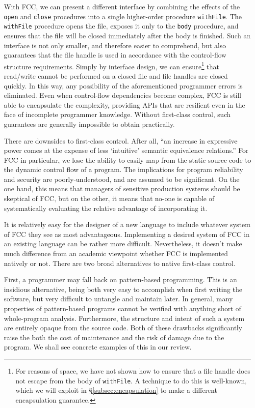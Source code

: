 \documentclass[11pt]{article}
\begin{document}
With FCC, we can present a different interface by combining the effects of the \texttt{open} and \texttt{close} procedures into a single higher-order procedure \texttt{withFile}.
The \texttt{withFile} procedure opens the file, exposes it only to the \texttt{body} procedure, and ensures that the file will be closed immediately after the body is finished.
Such an interface is not only smaller, and therefore easier to comprehend, but also guarantees that the file handle is used in accordance with the control-flow structure requirements.
Simply by interface design, we can ensure\footnote{For reasons of space, we have not shown how to ensure that a file handle does not escape from the body of \texttt{withFile}. A technique to do this is well-known\cite{StateInHaskell}, which we will exploit in \S\ref{subsec:encapsulation} to make a different encapsulation guarantee.} that read/write cannot be performed on a closed file and file handles are closed quickly.
In this way, any possibility of the aforementioned programmer errors is eliminated.
Even when control-flow dependencies become complex, FCC is still able to encapsulate the complexity, providing APIs that are resilient even in the face of incomplete programmer knowledge.
Without first-class control, such guarantees are generally impossible to obtain practically.


There are downsides to first-class control. After all, ``an increase in expressive power comes at the expense of less `intuitive' semantic equivalence relations.''\cite{Felleisen90expressive}
For FCC in particular, we lose the ability to easily map from the static source code to the dynamic control flow of a program.
The implications for program reliability and security are poorly-understood, and are assumed to be significant.
On the one hand, this means that managers of sensitive production systems should be skeptical of FCC, but on the other, it means that no-one is capable of systematically evaluating the relative advantage of incorporating it.

It is relatively easy for the designer of a new language to include whatever system of FCC they see as most advantageous.
Implementing a desired system of FCC in an existing language can be rather more difficult.
Nevertheless, it doesn't make much difference from an academic viewpoint whether FCC is implemented natively or not.
There are two broad alternatives to native first-class control.

First, a programmer may fall back on pattern-based programming.
This is an insidious alternative, being both very easy to accomplish when first writing the software, but very difficult to untangle and maintain later.
In general, many properties of pattern-based programs cannot be verified with anything short of whole-program analysis.
Furthermore, the structure and intent of such a system are entirely opaque from the source code.\cite{Felleisen90expressive}
Both of these drawbacks significantly raise the both the cost of maintenance and the risk of damage due to the program.
We shall see concrete examples of this in our review.
\end{document}
